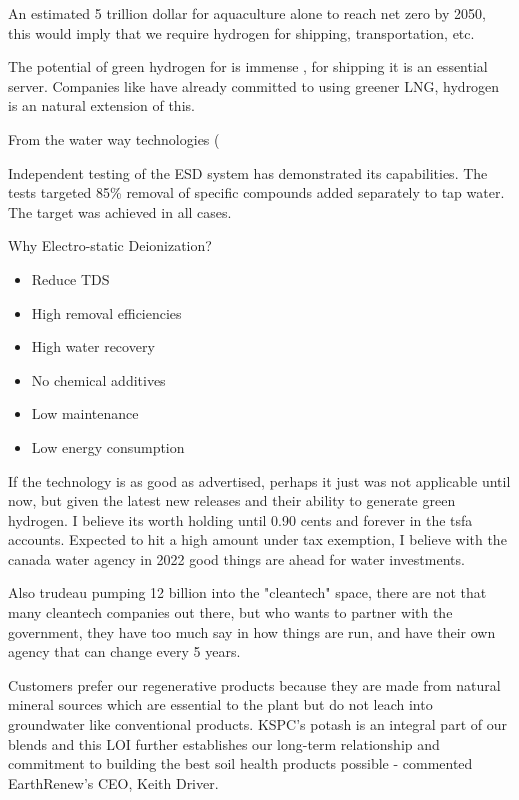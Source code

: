 An estimated 5 trillion dollar for aquaculture alone \cite{goldman_sachs_hydrogen_2022} to reach net zero by 2050, this would imply that we require hydrogen for shipping, transportation, etc.


The potential of green hydrogen for is immense \cite{shipping_green_hydrogen}, for shipping it is an essential server. Companies like  have already committed to using greener LNG, hydrogen is an natural extension of this.

From the water way technologies (

Independent testing of the ESD system has demonstrated its capabilities. The tests targeted 85\% removal of specific compounds added separately to tap water. The target was achieved in all cases. \cite{cwti_esd}

Why Electro-static Deionization? 
\begin{itemize}
    \item Reduce TDS
    \item High removal efficiencies
    \item High water recovery
    \item No chemical additives
    \item Low maintenance
    \item Low energy consumption
\end{itemize}

If the technology is as good as advertised, perhaps it just was not applicable until now, but given the latest new releases and their ability to generate green hydrogen. I believe its worth holding until 0.90 cents and forever in the tsfa accounts. Expected to hit a high amount under tax exemption, I believe with the canada water agency in 2022 good things are ahead for water investments.

Also trudeau pumping 12 billion into the "cleantech" space, there are not that many cleantech companies out there, but who wants to partner with the government, they have too much say in how things are run, and have their own agency that can change every 5 years.


 \begin{displayquote}
Customers prefer our regenerative products because they are made from natural mineral sources which are essential to the plant but do not leach into groundwater like conventional products. KSPC’s potash is an integral part of our blends and this LOI further establishes our long-term relationship and commitment to building the best soil health products possible - commented EarthRenew’s CEO, Keith Driver.
    \end{displayquote}